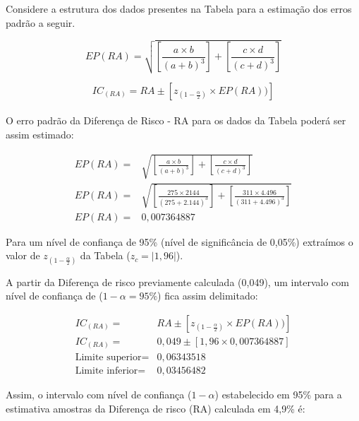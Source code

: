 \documentclass[
]{book}
\begin{document}
\hfill\break

Considere a estrutura dos dados presentes na Tabela para a estimação dos erros padrão a seguir.

\hfill\break

\[
EP(RA) = \sqrt{ \left [ \frac{a \times b}{(a+b)^3} \right ]  + \left [ \frac{c \times d}{(c+d)^3} \right ]  }
\]

\hfill\break

\[
IC_{(RA)} = RA \pm \left[ z_{(1-\frac{\alpha}{2})} \times EP(RA))\right] 
\]\\

O erro padrão da Diferença de Risco - RA para os dados da Tabela poderá ser assim estimado:

\hfill\break

\begin{align*}
EP(RA)  = & \sqrt{ \left [ \frac{a \times b}{(a+b)^3} \right ]  + \left [ \frac{c \times d}{(c+d)^3} \right ]  }\\
EP(RA)  = & \sqrt{ \left [ \frac{275 \times 2144}{(275+2.144)^3} \right ]  + \left [ \frac{311 \times 4.496}{(311+4.496)^3} \right ]  }\\
EP(RA)  = & 0,007364887
\end{align*}

\hfill\break

Para um nível de confiança de 95\% (nível de significância de 0,05\%) extraímos o valor de \(z_{(1-\frac{\alpha}{2})}\) da Tabela (\(z_{c}=|1,96|\)).

\hfill\break

A partir da Diferença de risco previamente calculada (0,049), um intervalo com nível de confiança de (\(1-\alpha=95\%\)) fica assim delimitado:

\hfill\break

\begin{align*}
IC_{(RA)}  = & RA \pm \left[ z_{(1-\frac{\alpha}{2})} \times EP(RA))\right] \\
IC_{(RA)}  = & 0,049 \pm \left[ 1,96  \times 0,007364887 \right] \\
\text{Limite superior}  = & 0,06343518 \\
\text{Limite inferior}  = & 0,03456482
\end{align*}

\hfill\break

Assim, o intervalo com nível de confiança (\(1-\alpha\)) estabelecido em 95\% para a estimativa amostras da Diferença de risco (RA) calculada em 4,9\% é:

\hfill\break
\end{document}
